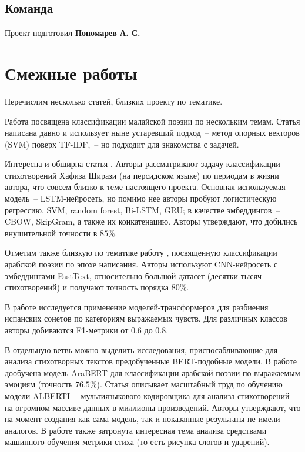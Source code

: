 \documentclass[a4paper,12pt]{article}
\begin{document}
\subsection{Команда}

Проект подготовил \textbf{Пономарев А. С.}


\section{Смежные работы}

Перечислим несколько статей, близких проекту по тематике.

Работа \cite{noraini2012} посвящена классификации малайской поэзии по нескольким темам. Статья написана давно и использует ныне устаревший подход~-- метод опорных векторов (SVM) поверх TF-IDF,~-- но подходит для знакомства с задачей.

Интересна и обширна статья \cite{ruma2022}. Авторы рассматривают задачу классификации стихотворений Хафиза Ширази (на персидском языке) по периодам в жизни автора, что совсем близко к теме настоящего проекта. Основная используемая модель~-- LSTM-нейросеть, но помимо нее авторы пробуют логистическую регрессию, SVM, random forest, Bi-LSTM, GRU; в качестве эмбеддингов~-- CBOW, SkipGram, а также их конкатенацию. Авторы утверждают, что добились внушительной точности в $85 \%$.

Отметим также близкую по тематике работу \cite{orabi2020}, посвященную классификации арабской поэзии по эпохе написания. Авторы используют CNN-нейросеть с эмбеддингами FastText, относительно большой датасет (десятки тысяч стихотворений) и получают точность порядка $80 \%$.

В работе \cite{barbado2021} исследуется применение моделей-трансформеров для разбиения испанских сонетов по категориям выражаемых чувств. Для различных классов авторы добиваются F1-метрики от $0.6$ до $0.8$.

В отдельную ветвь можно выделить исследования, приспосабливающие для анализа стихотворных текстов предобученные BERT-подобные модели. В работе \cite{shahriar2023} дообучена модель AraBERT для классификации арабской поэзии по выражаемым эмоциям (точность $76.5 \%$). Статья \cite{rosa2023} описывает масштабный труд по обучению модели ALBERTI~-- мультиязыкового кодировщика для анализа стихотворений~-- на огромном массиве данных в миллионы произведений. Авторы утверждают, что на момент создания как сама модель, так и показанные результаты не имели аналогов. В работе также затронута интересная тема анализа средствами машинного обучения метрики стиха (то есть рисунка слогов и ударений).
\end{document}
